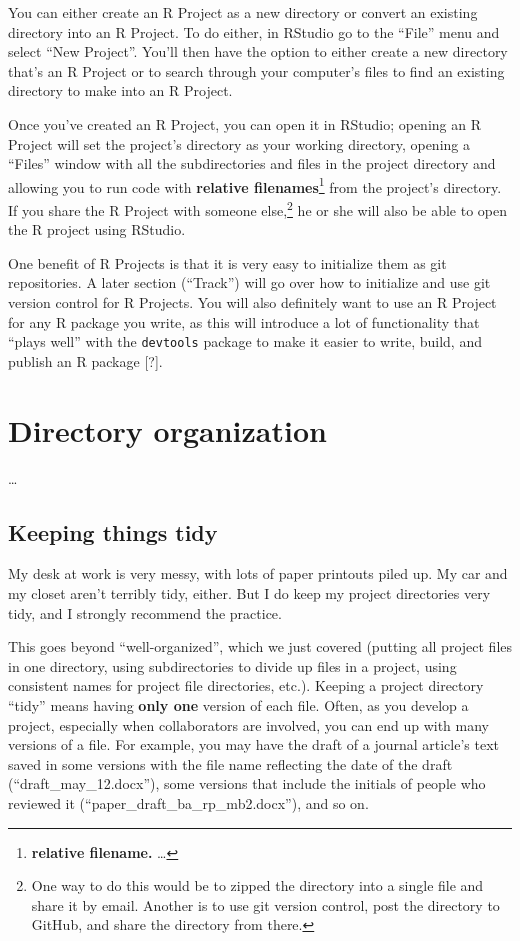 \documentclass[]{tufte-book}
\begin{document}
You can either create an R Project as a new directory or convert an existing directory into
an R Project. To do either, in RStudio go to the ``File'' menu and select ``New Project''. You'll
then have the option to either create a new directory that's an R Project or to search through
your computer's files to find an existing directory to make into an R Project.

Once you've created an R Project, you can open it in RStudio; opening an R Project will set
the project's directory as your working directory, opening a ``Files'' window with all the
subdirectories and files in the project directory and allowing you to run code with
\textbf{relative filenames}\footnote{\textbf{relative filename.} \ldots{}} from the project's directory. If you
share the R Project with someone else,\footnote{One way to do this would be to zipped the directory
  into a single file and share it by email. Another is to use git version control, post the
  directory to GitHub, and share the directory from there.} he or she will also be able to
open the R project using RStudio.

One benefit of R Projects is that it is very easy to initialize them as git repositories.
A later section (``Track'') will go over how to initialize and use git version control for
R Projects. You will also definitely want to use an R Project for any R package you write,
as this will introduce a lot of functionality that ``plays well'' with the \texttt{devtools} package
to make it easier to write, build, and publish an R package {[}?{]}.

\hypertarget{directory-organization}{%
\section{Directory organization}\label{directory-organization}}

\ldots{}

\hypertarget{keeping-things-tidy}{%
\subsection{Keeping things tidy}\label{keeping-things-tidy}}

My desk at work is very messy, with lots of paper printouts piled up. My car and my closet
aren't terribly tidy, either. But I do keep my project directories very tidy, and I
strongly recommend the practice.

This goes beyond ``well-organized'', which we just covered (putting all project
files in one directory, using subdirectories to divide up files in a project,
using consistent names for project file directories, etc.). Keeping a project directory
``tidy'' means having \textbf{only one} version of each file. Often, as you develop a project,
especially when collaborators are involved, you can end up with many versions of a
file. For example, you may have the draft of a journal article's text saved
in some versions with the file name reflecting the date of the draft (``draft\_may\_12.docx''),
some versions that include the initials of people who reviewed it (``paper\_draft\_ba\_rp\_mb2.docx''),
and so on.
\end{document}
